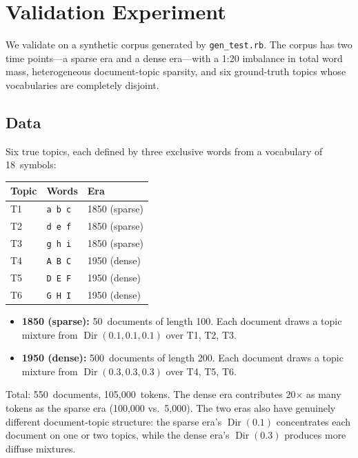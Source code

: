 \documentclass[11pt]{article}
\begin{document}
\appendix
\section{Validation Experiment}

We validate on a synthetic corpus generated by \texttt{gen\_test.rb}.
The corpus has two time points---a sparse era and a dense era---with a 1:20 imbalance in total word mass, heterogeneous document-topic sparsity, and six ground-truth topics whose vocabularies are completely disjoint.

\subsection{Data}

Six true topics, each defined by three exclusive words from a vocabulary of 18~symbols:

\begin{center}
\begin{tabular}{@{}l l l@{}}
\toprule
\textbf{Topic} & \textbf{Words} & \textbf{Era} \\
\midrule
T1 & \texttt{a b c} & 1850 (sparse) \\
T2 & \texttt{d e f} & 1850 (sparse) \\
T3 & \texttt{g h i} & 1850 (sparse) \\
T4 & \texttt{A B C} & 1950 (dense)  \\
T5 & \texttt{D E F} & 1950 (dense)  \\
T6 & \texttt{G H I} & 1950 (dense)  \\
\bottomrule
\end{tabular}
\end{center}

\begin{itemize}
\item \textbf{1850 (sparse):} 50~documents of length 100.  Each document draws a topic mixture from $\operatorname{Dir}(0.1, 0.1, 0.1)$ over T1, T2, T3.
\item \textbf{1950 (dense):} 500~documents of length 200.  Each document draws a topic mixture from $\operatorname{Dir}(0.3, 0.3, 0.3)$ over T4, T5, T6.
\end{itemize}

Total: 550~documents, 105{,}000~tokens.
The dense era contributes 20$\times$ as many tokens as the sparse era (100{,}000 vs.\ 5{,}000).
The two eras also have genuinely different document-topic structure: the sparse era's $\operatorname{Dir}(0.1)$ concentrates each document on one or two topics, while the dense era's $\operatorname{Dir}(0.3)$ produces more diffuse mixtures.
\end{document}
